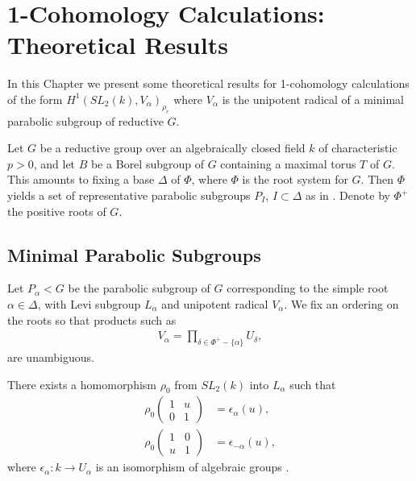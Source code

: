 
\chapter{1-Cohomology Calculations: Theoretical Results}
\label{Chapter5}

In this Chapter we present some theoretical results for 1-cohomology calculations of the form $H^1(SL_2(k), V_\alpha)_{\rho_r}$ where $V_\alpha$ is the unipotent radical of a minimal parabolic subgroup of reductive $G$.

Let $G$ be a reductive group over an algebraically closed field $k$ of characteristic $p>0$, and let $B$ be a Borel subgroup of $G$ containing a maximal torus $T$ of $G$. This amounts to fixing a base $\Delta$ of $\Phi$, where $\Phi$ is the root system for $G$. Then $\Phi$ yields a set of representative parabolic subgroups $P_I$, $I \subset \Delta$ as in \cite[\S 30]{humphreys1975linear}. Denote by $\Phi^+$ the positive roots of $G$.

\section{Minimal Parabolic Subgroups}

Let $P_\alpha<G$ be the parabolic subgroup of $G$ corresponding to the simple root $\alpha\in\Delta$, with Levi subgroup $L_\alpha$ and unipotent radical $V_\alpha$.
We fix an ordering on the roots so that products such as
\begin{align*}
V_\alpha = \prod_{\delta\in\Phi^+ -\{\alpha\}} U_\delta,
\end{align*}
are unambiguous.

There exists a homomorphism $\rho_0$ from $ SL_2(k)$ into $L_\alpha$ such that
\begin{align*}
\rho_0 \left(\begin{matrix} 1 &  u \\ 0 & 1 \end{matrix} \right) &= \epsilon_\alpha(u), \\
\rho_0 \left(\begin{matrix} 1 & 0 \\ u & 1 \end{matrix} \right) &= \epsilon_{-\alpha}(u),
\end{align*}
where $\epsilon_\alpha : k \rightarrow U_\alpha$ is an isomorphism of algebraic groups \cite[Theorem 26.3(c)]{humphreys1975linear}.

